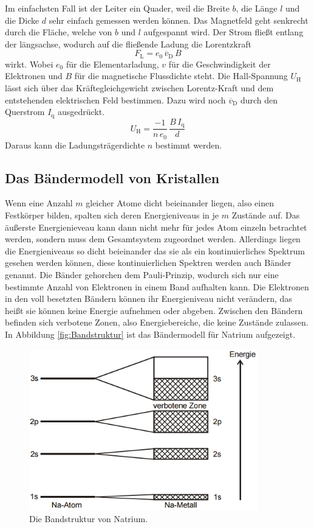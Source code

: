 Im einfachsten Fall ist der Leiter ein Quader, weil die Breite $b$, die Länge $l$ und die Dicke $d$ sehr einfach gemessen werden können. Das Magnetfeld geht senkrecht durch die Fläche, welche von $b$ und $l$ aufgespannt wird. Der Strom fließt entlang der längsachse, wodurch auf die fließende Ladung die Lorentzkraft
\begin{equation}
	F_\text{L} = e_0\,\overline{v}_\text{D}\,B
	\label{eqn:FL}
\end{equation}
wirkt. Wobei $e_0$ für die Elementarladung, $v$ für die Geschwindigkeit der Elektronen und $B$ für die magnetische Flussdichte steht. Die Hall-Spannung $U_\text{H}$ lässt sich über das Kräftegleichgewicht zwischen Lorentz-Kraft und dem entstehenden elektrischen Feld bestimmen. Dazu wird noch $\overline{v}_\text{D}$ durch den Querstrom $I_\text{q}$ ausgedrückt.
\begin{equation}
	U_\text{H} = \frac{-1}{n\,e_0}\,\frac{B\,I_\text{q}}{d}
	\label{eqn:UH}
\end{equation}
Daraus kann die Ladungsträgerdichte $n$ bestimmt werden.


\subsection{Das Bändermodell von Kristallen}
Wenn eine Anzahl $m$ gleicher Atome dicht beieinander liegen, also einen Festkörper bilden, spalten sich deren Energieniveaus in je $m$ Zustände auf. Das äußerste Energienieveau kann dann nicht mehr für jedes Atom einzeln betrachtet werden, sondern muss dem Gesamtsystem zugeordnet werden. Allerdings liegen die Energieniveaus so dicht beieinander das sie als ein kontinuierliches Spektrum gesehen werden können, diese kontinuierlichen Spektren werden auch Bänder genannt. Die Bänder gehorchen dem Pauli-Prinzip, wodurch sich nur eine bestimmte Anzahl von Elektronen in einem Band aufhalten kann. Die Elektronen in den voll besetzten Bändern können ihr Energieniveau nicht verändern, das heißt sie können keine Energie aufnehmen oder abgeben. Zwischen den Bändern befinden sich verbotene Zonen, also Energiebereiche, die keine Zustände zulassen. In Abbildung \eqref{fig:Bandstruktur} ist das Bändermodell für Natrium aufgezeigt.

\begin{figure}[H]
	\centering
	\includegraphics[height=7cm]{picture/Bandstruktur.png}
	\caption{Die Bandstruktur von Natrium. \cite[2]{sample}}
	\label{fig:Bandstruktur}
\end{figure}

